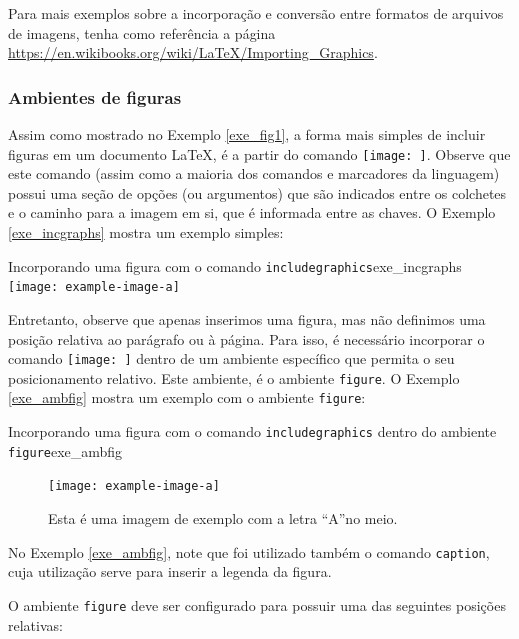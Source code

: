 \begin{marker}
  Para mais exemplos sobre a incorporação e conversão entre formatos de arquivos de imagens, tenha como referência a página \url{https://en.wikibooks.org/wiki/LaTeX/Importing_Graphics}.
\end{marker}

\subsubsection*{Ambientes de figuras}
\label{sec:amb_docs/figs}

Assim como mostrado no Exemplo \ref{exe_fig1}, a forma mais simples de incluir figuras em um documento \LaTeX{}, é a partir do comando \texttt{\texttt{[image: ]}}. Observe que este comando (assim como a maioria dos comandos e marcadores da linguagem) possui uma seção de opções (ou argumentos) que são indicados entre os colchetes e o caminho para a imagem em si, que é informada entre as chaves. O Exemplo \ref{exe_incgraphs} mostra um exemplo simples:

\begin{texexptitled}[breakable,enhanced,middle=2mm]{Incorporando uma figura com o comando {\tt includegraphics}}{exe_incgraphs}
\texttt{[image: example-image-a]}
\end{texexptitled}

Entretanto, observe que apenas inserimos uma figura, mas não definimos uma posição relativa ao parágrafo ou à página. Para isso, é necessário incorporar o comando \texttt{\texttt{[image: ]}} dentro de um ambiente específico que permita o seu posicionamento relativo. Este ambiente, é o ambiente {\tt figure}. O Exemplo \ref{exe_ambfig} mostra um exemplo com o ambiente {\tt figure}:

\begin{texexptitled}[breakable,enhanced,middle=2mm]{Incorporando uma figura com o comando {\tt includegraphics} dentro do ambiente {\tt figure}}{exe_ambfig}
\begin{figure}[H]
    \texttt{[image: example-image-a]}
    \caption{Esta é uma imagem de exemplo com a letra ``A''no meio.}
\end{figure}
\end{texexptitled}

No Exemplo \ref{exe_ambfig}, note que foi utilizado também o comando \texttt{caption}, cuja utilização serve para inserir a legenda da figura.

O ambiente {\tt figure} deve ser configurado para possuir uma das seguintes posições relativas:

